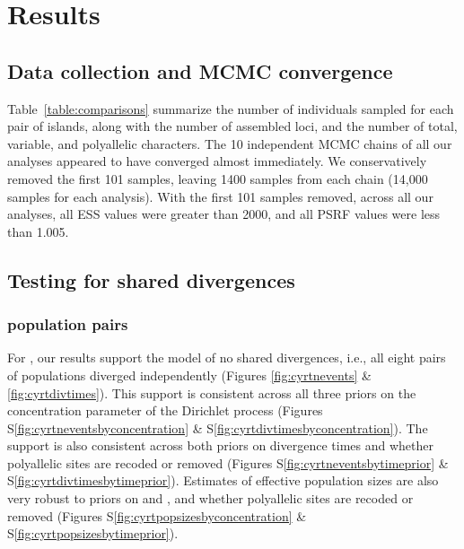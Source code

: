 \section{Results}

\subsection{Data collection and MCMC convergence}
Table~\ref{table:comparisons} summarize the number of individuals sampled for
each pair of islands, along with the number of assembled loci, and the number
of total, variable, and polyallelic characters.
The 10 independent MCMC chains of all our \ecoevolity analyses appeared to have
converged almost immediately.
We conservatively removed the first 101 samples, leaving 1400 samples from each
chain (14,000 samples for each analysis).
With the first 101 samples removed, across all our analyses, all ESS values
were greater than 2000, and all PSRF values were less than 1.005.

\subsection{Testing for shared divergences}

\subsubsection{ population pairs}
For , our \ecoevolity results support the model of no shared
divergences, i.e., all eight pairs of populations diverged independently
(Figures \ref{fig:cyrtnevents} \& \ref{fig:cyrtdivtimes}).
This support is consistent across all three priors on the concentration
parameter of the Dirichlet process
(Figures
S\ref{fig:cyrtneventsbyconcentration}
\&
S\ref{fig:cyrtdivtimesbyconcentration}).
The support is also consistent across both priors on divergence times
and whether polyallelic sites are recoded or removed
(Figures
S\ref{fig:cyrtneventsbytimeprior}
\&
S\ref{fig:cyrtdivtimesbytimeprior}).
Estimates of effective population sizes are also very robust to
priors on \concentration and \divtime, and whether polyallelic sites
are recoded or removed
(Figures
S\ref{fig:cyrtpopsizesbyconcentration}
\&
S\ref{fig:cyrtpopsizesbytimeprior}).

\ifembed{

}{}

\ifembed{

}{}

